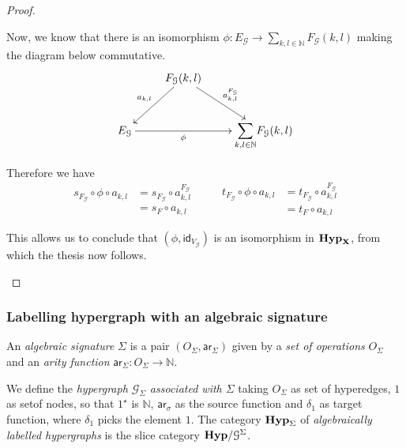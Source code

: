 \documentclass[runningheads,envcountsect]{lipics-v2021}
\def\X{\textbf {\textup{X}}}
\def\E{\textbf {\textup{E}}}
\newcommand{\catname}[1]{\textbf{\textup{#1}}}
\newcommand{\hyp}{\catname{Hyp}}
\newcommand{\hyps}{\catname{Hyp}_{\Sigma}}
\newcommand{\ari}{\mathsf{ar}}
\newcommand{\Sum}{\mathlarger{\sum}}
\newcommand{\id}[1]{\mathsf{id}_{#1}}
\begin{document}
\begin{proof}
\begin{itemize}
		Now, we know that there is an isomorphism $\phi \colon E_{\mathcal{G}} \to \sum_{k,l\in \mathbb{N}} F_{\mathcal{G}}(k,l)$ making the diagram below commutative.
	\[\xymatrix{& F_{\mathcal{G}}(k,l) \ar[dr]^{a^{F_\mathcal{{G}}}_{k,l}} \ar[dl]_{a_{k,l}} \\E_{\mathcal{G}} \ar[rr]_-{\phi} & & \Sum_{k,l\in \mathbb{N}} F_{\mathcal{G}}(k,l)}\]
	
	Therefore we have
	\[\begin{split}
	s_{F_{\mathcal{G}}} \circ \phi \circ a_{k,l}&=	s_{F_{\mathcal{G}}}  \circ a^{F_{\mathcal{G}}}_{k,l}	\\&= s_F\circ a_{k,l} \end{split} \qquad \begin{split}
	t_{F_{\mathcal{G}}} \circ \phi \circ a_{k,l}&=	t_{F_{\mathcal{G}}}  \circ a^{F_{\mathcal{G}}}_{k,l}	\\&= t_F\circ a_{k,l} \end{split}\]
	
	This allows us to conclude that $(\phi, \id{V_{\mathcal{G}}})$ is an isomorphism in $\hyp_\X$, from which the thesis now follows. 
	\end{itemize}
\end{proof}
\fi 


\subsubsection{Labelling hypergraph with an algebraic signature}

\begin{definition}
An \emph{algebraic signature} $\Sigma$ is a pair $(O_\Sigma, \ari_\Sigma)$ given by a \emph{set of operations} $O_\Sigma$ and an \emph{arity function} $\ari_\Sigma\colon O_\Sigma \to \mathbb{N}$. 

We define the \emph{hypergraph $\mathcal{G}_\Sigma$ associated with $\Sigma$} taking $O_\Sigma$ as set of hyperedges, $1$ as setof nodes, so that $1^\star$ is $\mathbb{N}$, $\ari_\sigma$ as the source function and $\delta_1$ as target function, where $\delta_1$ picks the element $1$. The category $\hyps$ of \emph{algebraically labelled hypergraphs} is the slice category $\hyp/\mathcal{G}^\Sigma$.
\end{definition}
\end{document}
